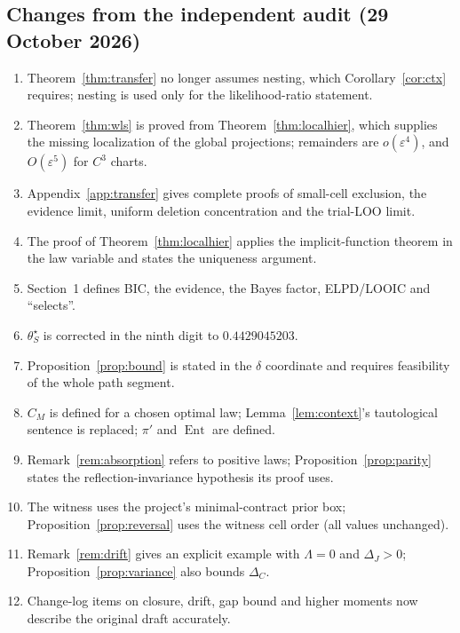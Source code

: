 \documentclass[11pt,letterpaper]{article}
\theoremstyle{plain}
\theoremstyle{definition}
\begin{document}
\subsection{Changes from the independent audit (29 October 2026)}
\begin{enumerate}
\item Theorem~\ref{thm:transfer} no longer assumes nesting, which Corollary~\ref{cor:ctx} requires; nesting is used only for the likelihood-ratio statement.
\item Theorem~\ref{thm:wls} is proved from Theorem~\ref{thm:localhier}, which supplies the missing localization of the global projections; remainders are $o(\varepsilon^4)$, and $O(\varepsilon^5)$ for $C^3$ charts.
\item Appendix~\ref{app:transfer} gives complete proofs of small-cell exclusion, the evidence limit, uniform deletion concentration and the trial-LOO limit.
\item The proof of Theorem~\ref{thm:localhier} applies the implicit-function theorem in the law variable and states the uniqueness argument.
\item Section~1 defines BIC, the evidence, the Bayes factor, ELPD/LOOIC and ``selects''.
\item $\theta_S^\star$ is corrected in the ninth digit to $0.4429045203$.
\item Proposition~\ref{prop:bound} is stated in the $\delta$ coordinate and requires feasibility of the whole path segment.
\item $C_M$ is defined for a chosen optimal law; Lemma~\ref{lem:context}'s tautological sentence is replaced; $\pi'$ and $\operatorname{Ent}$ are defined.
\item Remark~\ref{rem:absorption} refers to positive laws; Proposition~\ref{prop:parity} states the reflection-invariance hypothesis its proof uses.
\item The witness uses the project's minimal-contract prior box; Proposition~\ref{prop:reversal} uses the witness cell order (all values unchanged).
\item Remark~\ref{rem:drift} gives an explicit example with $\Lambda=0$ and $\Delta_J>0$; Proposition~\ref{prop:variance} also bounds $\Delta_C$.
\item Change-log items on closure, drift, gap bound and higher moments now describe the original draft accurately.
\end{enumerate}
\end{document}
